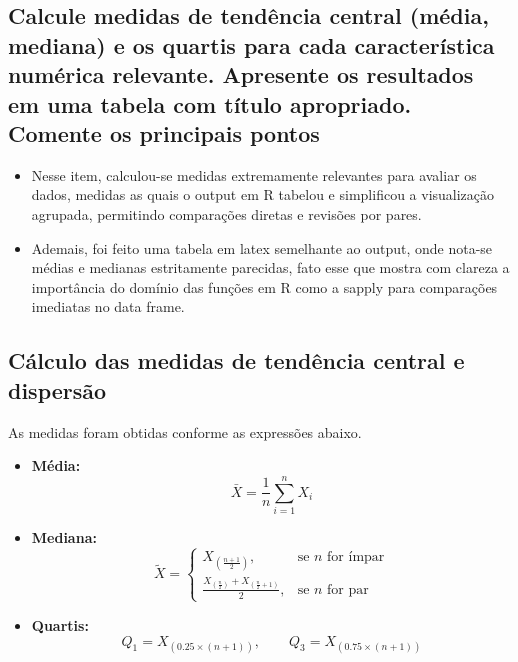 \documentclass[12pt,a4paper]{article}
\begin{document}
\subsection{ Calcule medidas de tendência central (média, mediana) e os quartis para cada característica numérica relevante. Apresente os resultados em uma tabela com título
 apropriado. Comente os principais pontos  }
 \begin{itemize}
    \item Nesse item, calculou-se medidas extremamente relevantes para avaliar os dados, medidas as quais o output em R tabelou e simplificou a visualização agrupada, permitindo comparações diretas e revisões por pares.
    \item Ademais, foi feito uma tabela em latex semelhante ao output, onde nota-se médias e medianas estritamente parecidas, fato esse que mostra com clareza a importância do domínio das funções em R como a  sapply para comparações imediatas no data frame.
    
    
    
\end{itemize}

\subsection*{Cálculo das medidas de tendência central e dispersão}

As medidas foram obtidas conforme as expressões abaixo.

\begin{itemize}
    \item \textbf{Média:}
    \[
    \bar{X} = \frac{1}{n} \sum_{i=1}^{n} X_i
    \]

    \item \textbf{Mediana:}
    \[
    \tilde{X} = 
    \begin{cases}
    X_{\left( \frac{n+1}{2} \right)}, & \text{se } n \text{ for ímpar} \\
    \frac{X_{\left( \frac{n}{2} \right)} + X_{\left( \frac{n}{2} + 1 \right)}}{2}, & \text{se } n \text{ for par}
    \end{cases}
    \]

    \item \textbf{Quartis:}
    \[
    Q_1 = X_{\left( 0.25 \times (n + 1) \right)}, \qquad
    Q_3 = X_{\left( 0.75 \times (n + 1) \right)}
    \]
\end{itemize}
 
\end{document}
